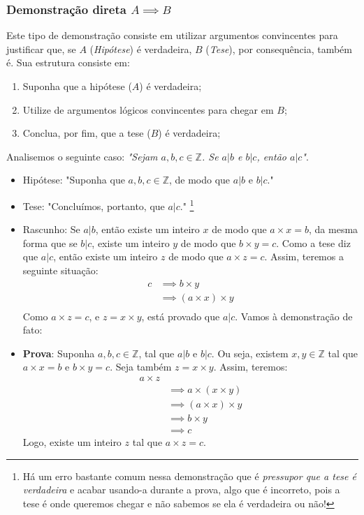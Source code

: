 \documentclass[13pt,letterpaper]{article}
\begin{document}
\subsubsection{Demonstração direta $A \implies B$}
Este tipo de demonstração consiste em utilizar argumentos convincentes para justificar que, se $A$ (\emph{Hipótese}) é verdadeira, $B$ (\emph{Tese}), por consequência, também é.  
Sua estrutura consiste em:
\begin{enumerate}
    \item Suponha que a hipótese ($A$) é verdadeira;
    \item Utilize de argumentos lógicos convincentes para chegar em $B$;
    \item Conclua, por fim, que a tese ($B$) é verdadeira;
\end{enumerate}
Analisemos o seguinte caso: \emph{"Sejam $a, b, c \in \mathbb{Z}$. Se $a|b$ e $b|c$, então $a|c$"}.
\begin{itemize}
    \item Hipótese: "Suponha que $a, b, c \in \mathbb{Z}$, de modo que $a|b$ e $b|c$."
    \item Tese: "Concluímos, portanto, que $a|c$." \footnote{Há um erro bastante comum nessa demonstração que é \emph{pressupor que a tese é verdadeira} e acabar usando-a durante a prova, algo que é incorreto, pois a tese é onde queremos chegar e não sabemos se ela é verdadeira ou não!} 
    \item Rascunho: Se $a|b$, então existe um inteiro $x$ de modo que $a \times x = b$, da mesma forma que se $b|c$, existe um inteiro $y$ de modo que $b \times y = c$. Como a tese diz que $a|c$, então existe um inteiro $z$ de modo que $a \times z = c$.
    Assim, teremos a seguinte situação:
    \begin{align*}
    c &\implies 
    b \times y \\ &\implies
    (a \times x) \times y \\
    \end{align*}
    Como $a \times z = c$, e $z = x \times y$, está provado que $a|c$. Vamos à demonstração de fato:
    \item \textbf{Prova}: Suponha $a, b, c \in \mathbb{Z}$, tal que $a|b$ e $b|c$. Ou seja, existem $x, y \in \mathbb{Z}$
    tal que $a \times x = b$ e $b \times y = c$. Seja também $z = x \times y$. Assim, teremos: 
    \begin{align*}
        a \times z \\ &\implies
        a \times (x \times y) \\ &\implies
        (a \times x) \times y \\ &\implies
        b \times y \\ &\implies
        c
    \end{align*}
    Logo, existe um inteiro $z$ tal que $a \times z = c$.
\end{itemize}
\end{document}
